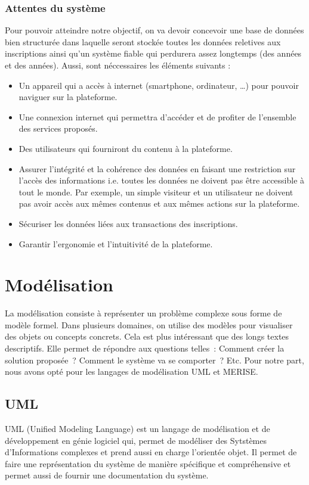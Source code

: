 \documentclass[12pt,a4paper]{article}
\begin{document}
	\subsubsection{Attentes du système}
	Pour pouvoir atteindre notre objectif, on va devoir concevoir une base de données bien structurée dans laquelle seront stockée toutes les données reletives aux inscriptions ainsi qu’un système fiable qui perdurera assez longtemps (des années et des années). Aussi, sont néccessaires les éléments suivants :
	\begin{itemize}
		\item Un appareil qui a accès à internet (smartphone, ordinateur, …) pour pouvoir naviguer sur la plateforme.
		\item Une connexion internet qui permettra d’accéder et de profiter de l'ensemble des services proposés.
		\item Des utilisateurs qui fourniront du contenu à la plateforme.
		\item Assurer l'intégrité et la cohérence des données en faisant une restriction sur l’accès des informations i.e. toutes les données ne doivent pas être accessible à tout le monde. Par exemple, un simple visiteur et un utilisateur ne doivent pas avoir accès aux mêmes contenus et aux mêmes actions sur la plateforme.
		\item Sécuriser les données liées aux transactions des inscriptions.
		\item Garantir l'ergonomie et l'intuitivité de la plateforme.
	\end{itemize}
	\newpage
	
	\section{Modélisation}
	La modélisation consiste à représenter un problème complexe sous forme de modèle formel. Dans plusieurs domaines, on utilise des modèles pour visualiser des objets ou concepts concrets. Cela est plus intéressant que des longs textes descriptifs. Elle permet de répondre aux questions telles : Comment créer la solution proposée ? Comment le système va se comporter ? Etc. Pour notre part, nous avons opté pour les langages de modélisation UML et MERISE.
	
	\subsection{UML}
	UML (Unified Modeling Language) est un langage de modélisation et de développement en génie logiciel qui, permet de modéliser des Sytstèmes d'Informations complexes et prend aussi en charge l'orientée objet. Il permet de faire une représentation du système de manière spécifique et compréhensive et permet aussi de fournir une documentation du système.
		
\end{document}
